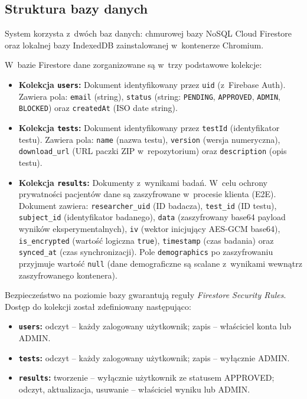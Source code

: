 \documentclass[12pt, a4paper, oneside]{report}
\begin{document}
\subsection{Struktura bazy danych}
\label{subsec:baza}

System korzysta z~dwóch baz danych: chmurowej bazy NoSQL Cloud Firestore oraz lokalnej bazy IndexedDB zainstalowanej w~kontenerze Chromium.

W~bazie Firestore dane zorganizowane są w~trzy podstawowe kolekcje:
\begin{itemize}
	\item \textbf{Kolekcja \texttt{users}:} Dokument identyfikowany przez \texttt{uid} (z~Firebase Auth). Zawiera pola: \texttt{email} (string), \texttt{status} (string: \texttt{PENDING}, \texttt{APPROVED}, \texttt{ADMIN}, \texttt{BLOCKED}) oraz \texttt{createdAt} (ISO date string).
	\item \textbf{Kolekcja \texttt{tests}:} Dokument identyfikowany przez \texttt{testId} (identyfikator testu). Zawiera pola: \texttt{name} (nazwa testu), \texttt{version} (wersja numeryczna), \texttt{download\_url} (URL paczki ZIP w~repozytorium) oraz \texttt{description} (opis testu).
	\item \textbf{Kolekcja \texttt{results}:} Dokumenty z~wynikami badań. W~celu ochrony prywatności pacjentów dane są zaszyfrowane w~procesie klienta (E2E). Dokument zawiera: \texttt{researcher\_uid} (ID badacza), \texttt{test\_id} (ID testu), \texttt{subject\_id} (identyfikator badanego), \texttt{data} (zaszyfrowany base64 payload wyników eksperymentalnych), \texttt{iv} (wektor inicjujący AES-GCM base64), \texttt{is\_encrypted} (wartość logiczna \texttt{true}), \texttt{timestamp} (czas badania) oraz \texttt{synced\_at} (czas synchronizacji). Pole \texttt{demographics} po zaszyfrowaniu przyjmuje wartość \texttt{null} (dane demograficzne są scalane z~wynikami wewnątrz zaszyfrowanego kontenera).
\end{itemize}

Bezpieczeństwo na poziomie bazy gwarantują reguły \textit{Firestore Security Rules}. Dostęp do kolekcji został zdefiniowany następująco:
\begin{itemize}[noitemsep]
	\item \textbf{\texttt{users}:} odczyt -- każdy zalogowany użytkownik; zapis -- właściciel konta lub ADMIN.
	\item \textbf{\texttt{tests}:} odczyt -- każdy zalogowany użytkownik; zapis -- wyłącznie ADMIN.
	\item \textbf{\texttt{results}:} tworzenie -- wyłącznie użytkownik ze statusem APPROVED; odczyt, aktualizacja, usuwanie -- właściciel wyniku lub ADMIN.
\end{itemize}
\end{document}
